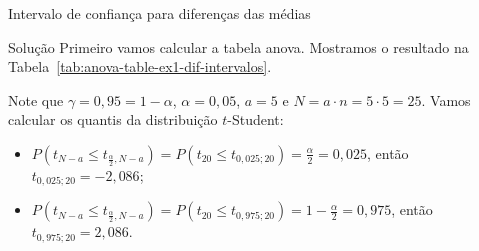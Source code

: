 \documentclass[8pt]{beamer}
\begin{document}
\begin{frame}{Intervalo de confiança para diferenças das médias}


\begin{block}{Solução}
	Primeiro vamos calcular a tabela anova. Mostramos o resultado na Tabela~\ref{tab:anova-table-ex1-dif-intervalos}.
	\begin{table}[ht]
		\centering
		\caption{Tabela ANOVA.} 
		\label{tab:anova-table-ex1-dif-intervalos}
	\end{table}
	
	Note que $\gamma = 0,95 = 1 - \alpha$, $\alpha = 0,05$, $a=5$ e $N = a \cdot n = 5 \cdot 5 = 25$. Vamos calcular os quantis da distribuição $t$-Student:
	\begin{itemize}
		\item $P\left( t_{N - a} \leq t_{\frac{\alpha}{2}, N - a} \right) = P\left( t_{20} \leq t_{0,025; 20} \right) = \frac{\alpha}{2} = 0,025$, então $t_{0,025; 20} = - 2,086$;
		\item $P\left( t_{N - a} \leq t_{\frac{\alpha}{2}, N - a} \right) = P\left( t_{20} \leq t_{0,975; 20} \right) = 1- \frac{\alpha}{2} = 0,975$, então $t_{0,975; 20} =  2,086$.
	\end{itemize}

%	
\end{block}

\end{frame}
\end{document}
